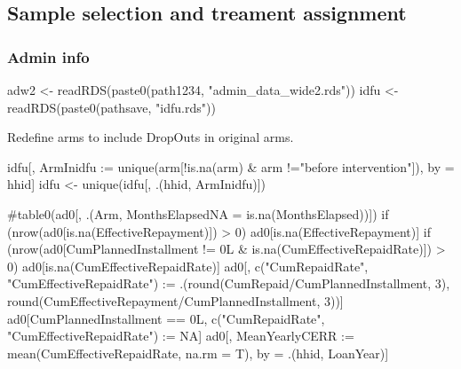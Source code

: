 \subsection{Sample selection and treament assignment}

\subsubsection{Admin info}

\begin{Schunk}
\begin{Sinput}
adw2 <- readRDS(paste0(path1234, "admin_data_wide2.rds"))
idfu <- readRDS(paste0(pathsave, "idfu.rds"))
\end{Sinput}
\end{Schunk}
Redefine arms to include \textsf{DropOuts} in original arms.
\begin{Schunk}
\begin{Sinput}
idfu[, ArmInidfu := unique(arm[!is.na(arm) & arm !="before intervention"]), by = hhid]
idfu <- unique(idfu[, .(hhid, ArmInidfu)])
\end{Sinput}
\end{Schunk}
\begin{Schunk}
\end{Schunk}
\begin{Schunk}
\begin{Sinput}
#table0(ad0[, .(Arm, MonthsElapsedNA = is.na(MonthsElapsed))])
if (nrow(ad0[is.na(EffectiveRepayment)]) > 0) ad0[is.na(EffectiveRepayment)]
if (nrow(ad0[CumPlannedInstallment != 0L & is.na(CumEffectiveRepaidRate)]) > 0) 
  ad0[is.na(CumEffectiveRepaidRate)]
ad0[,  c("CumRepaidRate", "CumEffectiveRepaidRate") := 
  .(round(CumRepaid/CumPlannedInstallment, 3), 
    round(CumEffectiveRepayment/CumPlannedInstallment, 3))]
ad0[CumPlannedInstallment == 0L, c("CumRepaidRate", "CumEffectiveRepaidRate") := NA]
ad0[, MeanYearlyCERR := mean(CumEffectiveRepaidRate, na.rm = T), by = .(hhid, LoanYear)]
\end{Sinput}
\end{Schunk}
